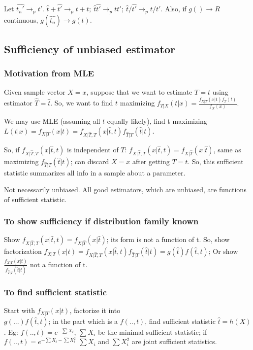 \documentclass[oneside, article]{memoir}
\begin{document}
Let $\hat{t_{n}'} \to_{p} t'$. $\hat{t} + \hat{t'} \to_{p} t + t;\ \hat{t}\hat{t'} \to_{p} tt';\ \hat{t}/\hat{t'} \to_{p} t/t'$. Also, if $g() \to R$ continuous, $g(\hat{t_{n}}) \to g(t)$.


\subsection{Sufficiency of unbiased estimator}
\subsubsection{Motivation from MLE}
Given sample vector $X=x$, suppose that we want to estimate $T=t$ using estimator $\hat{T}=\hat{t}$. So, we want to find $t$ maximizing $f_{T|X}(t|x) = \frac{f_{X|T}(x|t)f_T(t)}{f_{X}(x)}$.

We may use MLE (assuming all $t$ equally likely), find t maximizing $L(t|x) = f_{X|T}(x|t) = f_{X|\hat{T}, T}(x|\hat{t}, t)f_{\hat{T}|T}(\hat{t}|t)$.

So, if $f_{X|\hat{T}, T}(x|\hat{t}, t)$ is independent of $T$: $f_{X|\hat{T}, T}(x|\hat{t}, t) = f_{X|\hat{T}}(x|\hat{t})$, same as maximizing $f_{\hat{T}|T}(\hat{t}|t)$; can discard $X=x$ after getting $T=t$. So, this sufficient statistic summarizes all info in a sample about a parameter.

Not necessarily unbiased. All good estimators, which are unbiased, are functions of sufficient statistic.

\subsubsection{To show sufficiency if distribution family known}
Show $f_{X|\hat{T}, T}(x|\hat{t}, t) = f_{X|\hat{T}}(x|\hat{t})$; its form is not a function of t. So, show factorization $f_{X|T}(x|t) = f_{X|\hat{T}, T}(x|\hat{t}, t)f_{\hat{T}|T}(\hat{t}|t) = g(\hat{t})f(\hat{t},t)$; Or show $\frac{f_{X|T}(x|t)}{f_{\hat{T}|T}(\hat{t}|t)}$ not a function of t.

\subsubsection{To find sufficient statistic}
Start with $f_{X|T}(x|t)$, factorize it into \\
$g(...)f(\hat{t},t)$; in the part which is a $f(.., t)$, find sufficient statistic $\hat{t} = h(X)$. Eg: $f(.., t) = e^{-\sum X_{i}}$, $\sum X_{i}$ be the minimal sufficient statistic; if $f(.., t) = e^{-\sum X_{i} - \sum X_{i}^{2}}$ $\sum X_{i}$ and $\sum X_{i}^{2}$ are joint sufficient statistics.
\end{document}
